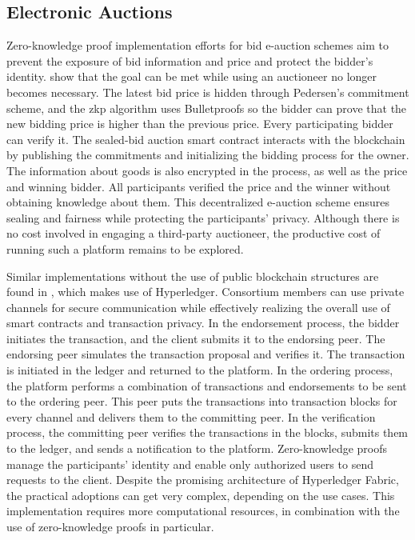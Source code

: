 \subsection{Electronic Auctions}
Zero-knowledge proof implementation efforts for bid e-auction schemes aim to prevent the exposure of bid information and price and protect the bidder's identity. \citet{LiXue} show that the goal can be met while using an auctioneer no longer becomes necessary. The latest bid price is hidden through Pedersen's commitment scheme, and the \acrshort{zkp} algorithm uses Bulletproofs so the bidder can prove that the new bidding price is higher than the previous price. Every participating bidder can verify it. The sealed-bid auction smart contract interacts with the blockchain by publishing the commitments and initializing the bidding process for the owner. The information about goods is also encrypted in the process, as well as the price and winning bidder. All participants verified the price and the winner without obtaining knowledge about them. This decentralized e-auction scheme ensures sealing and fairness while protecting the participants' privacy. Although there is no cost involved in engaging a third-party auctioneer, the productive cost of running such a platform remains to be explored.

Similar implementations without the use of public blockchain structures are found in \citet{WangZhaoMu}, which makes use of Hyperledger. Consortium members can use private channels for secure communication while effectively realizing the overall use of smart contracts and transaction privacy. In the endorsement process, the bidder initiates the transaction, and the client submits it to the endorsing peer. The endorsing peer simulates the transaction proposal and verifies it. The transaction is initiated in the ledger and returned to the platform. In the ordering process, the platform performs a combination of transactions and endorsements to be sent to the ordering peer. This peer puts the transactions into transaction blocks for every channel and delivers them to the committing peer. In the verification process, the committing peer verifies the transactions in the blocks, submits them to the ledger, and sends a notification to the platform. Zero-knowledge proofs manage the participants' identity and enable only authorized users to send requests to the client. Despite the promising architecture of Hyperledger Fabric, the practical adoptions can get very complex, depending on the use cases. This implementation requires more computational resources, in combination with the use of zero-knowledge proofs in particular.

